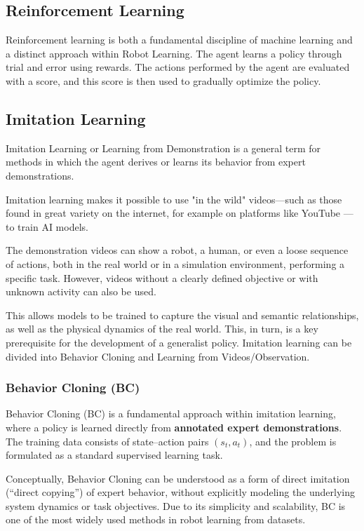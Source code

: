 \subsection{Reinforcement Learning}
Reinforcement learning is both a fundamental discipline of machine learning and a distinct approach within Robot Learning.
The agent learns a policy through trial and error using rewards. The actions performed by the agent are evaluated with a score, and this score is then used to gradually optimize the policy.

\subsection{Imitation Learning}
Imitation Learning or Learning from Demonstration is a general term for methods in which the agent derives or learns its behavior from expert demonstrations.

Imitation learning makes it possible to use "in the wild" videos—such as those found in great variety on the internet, for example on platforms like YouTube — to train AI models.

The demonstration videos can show a robot, a human, or even a loose sequence of actions, both in the real world or in a simulation environment, performing a specific task. However, videos without a clearly defined objective or with unknown activity can also be used.

This allows models to be trained to capture the visual and semantic relationships, as well as the physical dynamics of the real world. This, in turn, is a key prerequisite for the development of a generalist policy.
Imitation learning can be divided into Behavior Cloning and Learning from Videos/Observation.


\subsubsection{Behavior Cloning (BC)}
Behavior Cloning (BC) is a fundamental approach within imitation learning, where a policy is learned directly from \textbf{annotated expert demonstrations}. The training data consists of state–action pairs $(s_t, a_t)$, and the problem is formulated as a standard supervised learning task.  


Conceptually, Behavior Cloning can be understood as a form of direct imitation (``direct copying'') of expert behavior, without explicitly modeling the underlying system dynamics or task objectives. Due to its simplicity and scalability, BC is one of the most widely used methods in robot learning from datasets.  

